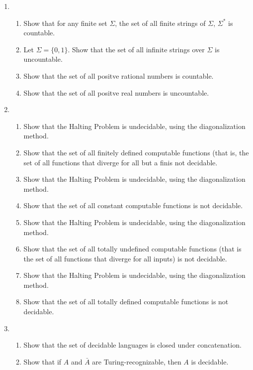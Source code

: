 \documentclass[11pt]{article}
\begin{document}
\begin{enumerate}
\begin{enumerate}
\end{enumerate}

\item 
\begin{enumerate}
	\item Show that for any finite set $\Sigma$, the set of all finite strings of $\Sigma$, 
		$\Sigma^*$ is countable.
	\item Let $\Sigma = \{0,1\}$.  Show that the set of all infinite strings over $\Sigma$ is 		uncountable.
	
	\item Show that the set of all positve rational numbers is countable.
	\item Show that the set of all positve real numbers is uncountable.
	
\end{enumerate}
\item 
\begin{enumerate}
	\item Show that the Halting Problem is undecidable, using the diagonalization method.
	\item Show that the set of all finitely defined computable functions (that is, the set of 
		all functions that diverge for all but a finis not decidable.

	\item Show that the Halting Problem is undecidable, using the diagonalization method.
	\item Show that the set of all constant computable functions is not decidable.
	
	\item Show that the Halting Problem is undecidable, using the diagonalization method.
	\item Show that the set of all totally undefined computable functions (that is the set of
		all functions that diverge for all inputs) is not decidable.
		
	\item Show that the Halting Problem is undecidable, using the diagonalization method.
	\item Show that the set of all totally defined computable functions is not decidable.
	
\end{enumerate}
\item
\begin{enumerate}
	\item Show that the set of decidable languages is closed under concatenation.
	\item Show that if $A$ and $\bar{A}$ are Turing-recognizable, then $A$ is decidable.


\end{enumerate}
\end{enumerate}
\end{document}
